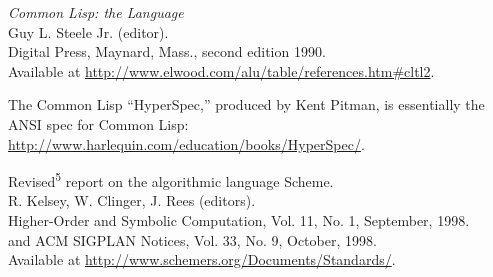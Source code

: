 \begin{description}
\tightlist
\item[\textbf{\href{}{{[}CommonLisp{]}}}]
\emph{Common Lisp: the Language}\\
Guy L. Steele Jr. (editor).\\
Digital Press, Maynard, Mass., second edition 1990.\\
Available at
\url{http://www.elwood.com/alu/table/references.htm\#cltl2}.

The Common Lisp ``HyperSpec,'' produced by Kent Pitman, is essentially
the ANSI spec for Common Lisp:
\url{http://www.harlequin.com/education/books/HyperSpec/}.
\item[\textbf{\href{}{{[}R5RS{]}}}]
Revised\textsuperscript{5} report on the algorithmic language Scheme.\\
R. Kelsey, W. Clinger, J. Rees (editors).\\
Higher-Order and Symbolic Computation, Vol. 11, No. 1, September,
1998.\\
and ACM SIGPLAN Notices, Vol. 33, No. 9, October, 1998.\\
Available at \url{http://www.schemers.org/Documents/Standards/}.
\end{description}

